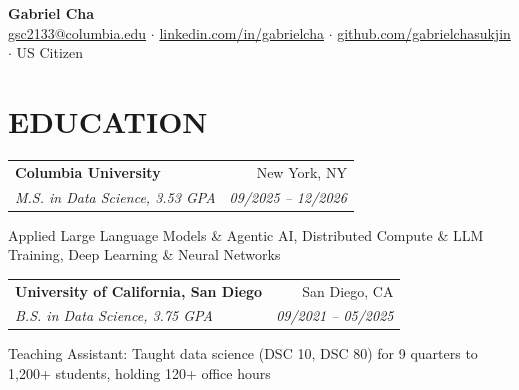\documentclass[letterpaper,10pt]{article}
\makeatletter
\newcommand{\resumeItem}[1]{%
  \item\small{#1 \vspace{-1.5pt}}%
}
\newcommand{\resumeSubheading}[4]{%
  \vspace{1pt}\item[]
  \begin{tabularx}{\linewidth}{@{}X r@{}}
    \textbf{#1} & {\small #2} \\
    \textit{\small #3} & \textit{\small #4} \\
  \end{tabularx}\vspace{-5pt}%
}
\newcommand{\resumeSubHeadingListStart}{\begin{resumeList}}
\newcommand{\resumeSubHeadingListEnd}{\end{resumeList}\vspace{2pt}}
\newcommand{\resumeItemListStart}{\begin{resumeItemList}}
\newcommand{\resumeItemListEnd}{\end{resumeItemList}}
\makeatother
\begin{document}
\begin{center}
  {\color{navy}\bfseries\fontsize{23}{27}\selectfont Gabriel Cha}\\[5pt]
  \small
  \href{mailto:gsc2133@columbia.edu}{gsc2133@columbia.edu} \enskip$\cdot$\enskip
  \href{https://linkedin.com/in/gabrielcha}{linkedin.com/in/gabrielcha} \enskip$\cdot$\enskip
  \href{https://github.com/gabrielchasukjin}{github.com/gabrielchasukjin} \enskip$\cdot$\enskip
  US Citizen
\end{center}

\section{EDUCATION}
\resumeSubHeadingListStart
  \resumeSubheading
    {Columbia University}{New York, NY}
    {M.S. in Data Science, 3.53 GPA}{09/2025 -- 12/2026}
    \resumeItemListStart
      \resumeItem{Applied Large Language Models \& Agentic AI, Distributed Compute \& LLM Training, Deep Learning \& Neural Networks}
    \resumeItemListEnd
  \resumeSubheading
    {University of California, San Diego}{San Diego, CA}
    {B.S. in Data Science, 3.75 GPA}{09/2021 -- 05/2025}
    \resumeItemListStart
      \resumeItem{Teaching Assistant: Taught data science (DSC 10, DSC 80) for 9 quarters to 1,200+ students, holding 120+ office hours}
    \resumeItemListEnd
\resumeSubHeadingListEnd

\end{document}
